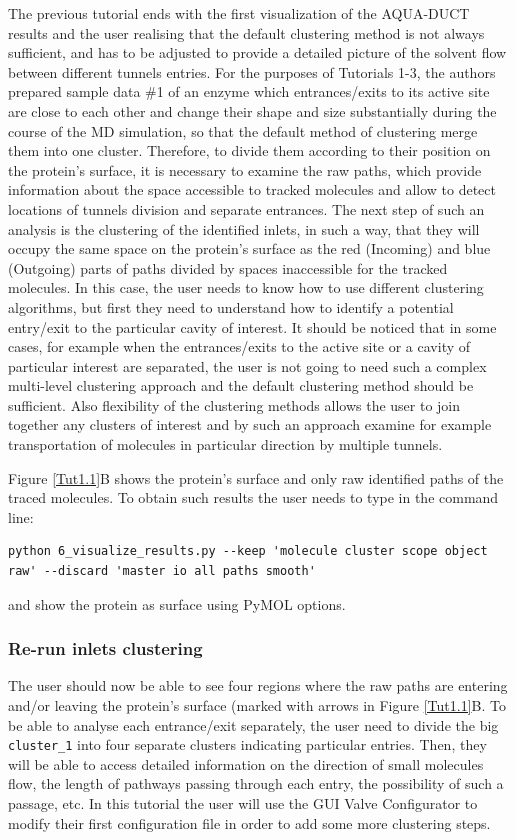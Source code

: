 \documentclass[9pt,tutorial, pubversion]{livecoms}
\begin{document}
The previous tutorial ends with the first visualization of the AQUA-DUCT results and the user realising that the default clustering method is not always sufficient, and has to be adjusted to provide a detailed picture of the solvent flow between different tunnels entries. For the purposes of Tutorials 1-3, the authors prepared sample data \#1 of an enzyme which entrances/exits to its active site are close to each other and change their shape and size substantially during the course of the MD simulation, so that the default method of clustering merge them into one cluster. Therefore, to divide them according to their position on the protein's surface, it is necessary to examine the raw paths, which provide information about the space accessible to tracked molecules and allow to detect locations of tunnels division and separate entrances. The next step of such an analysis is the clustering of the identified inlets, in such a way, that they will occupy the same space on the protein's surface as the red (Incoming) and blue (Outgoing) parts of paths divided by spaces inaccessible for the tracked molecules. In this case, the user needs to know how to use different clustering algorithms, but first they need to understand how to identify a potential entry/exit to the particular cavity of interest. It should be noticed that in some cases, for example when the entrances/exits to the active site or a cavity of particular interest are separated, the user is not going to need such a complex multi-level clustering approach and the default clustering method should be sufficient. Also flexibility of the clustering methods allows the user to join together any clusters of interest and by such an approach examine for example transportation of molecules in particular direction by multiple tunnels.

Figure \ref{Tut1.1}B shows the protein's surface and only raw identified paths of the traced molecules. To obtain such results the user needs to type in the command line:
\begin{lstlisting}[columns=fullflexible]
python 6_visualize_results.py --keep 'molecule cluster scope object raw' --discard 'master io all paths smooth'
\end{lstlisting}
and show the protein as surface using PyMOL options.

\subsubsection{Re-run inlets clustering}
The user should now be able to see four regions where the raw paths are entering and/or leaving the protein's surface (marked with arrows in Figure \ref{Tut1.1}B. To be able to analyse each entrance/exit separately, the user need to divide the big \texttt{cluster\_1} into four separate clusters indicating particular entries. Then, they will be able to access detailed information on the direction of small molecules flow, the length of pathways passing through each entry, the possibility of such a passage, etc. In this tutorial the user will use the GUI Valve Configurator to modify their first configuration file in order to add some more clustering steps. 
\end{document}
